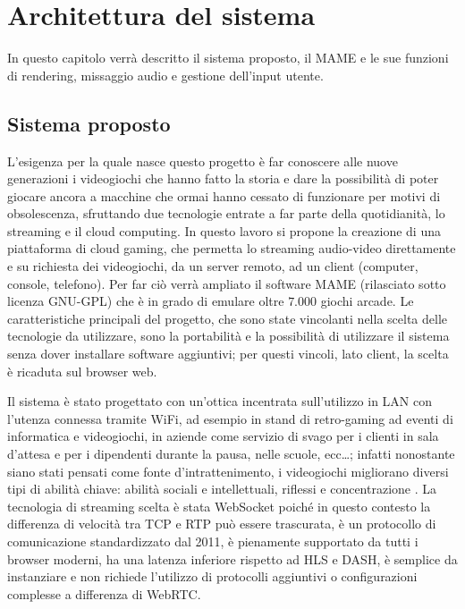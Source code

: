 %
%

\chapter{Architettura del sistema}
In questo capitolo verrà descritto il sistema proposto, il MAME e le sue funzioni di rendering, missaggio audio e gestione dell'input utente.




\section{Sistema proposto} \label{sec:cap2_SistemaProposto}
L'esigenza per la quale nasce questo progetto è far conoscere alle nuove generazioni i videogiochi che hanno fatto la storia e dare la possibilità di poter giocare ancora a macchine che ormai hanno cessato di funzionare per motivi di obsolescenza, sfruttando due tecnologie entrate a far parte della quotidianità, lo streaming e il cloud computing. In questo lavoro si propone la creazione di una piattaforma di cloud gaming, che permetta lo streaming audio-video direttamente e su richiesta dei videogiochi, da un server remoto, ad un client (computer, console, telefono). Per far ciò verrà ampliato il software MAME (rilasciato sotto licenza GNU-GPL) che è in grado di emulare oltre $7.000$ giochi arcade. Le caratteristiche principali del progetto, che sono state vincolanti nella scelta delle tecnologie da utilizzare, sono la portabilità e la possibilità di utilizzare il sistema senza dover installare software aggiuntivi; per questi vincoli, lato client, la scelta è ricaduta sul browser web.

Il sistema è stato progettato con un'ottica incentrata sull'utilizzo in LAN con l'utenza connessa tramite WiFi, ad esempio in stand di retro-gaming ad eventi di informatica e videogiochi, in aziende come servizio di svago per i clienti in sala d'attesa e per i dipendenti durante la pausa, nelle scuole, ecc\dots; infatti nonostante siano stati pensati come fonte d'intrattenimento, i videogiochi migliorano diversi tipi di abilità chiave: abilità sociali e intellettuali, riflessi e concentrazione \parencite{Use_of_Cloud_Gaming_in_Education}. La tecnologia di streaming scelta è stata WebSocket poiché in questo contesto la differenza di velocità tra TCP e RTP può essere trascurata, è un protocollo di comunicazione standardizzato dal 2011, è pienamente supportato da tutti i browser moderni, ha una latenza inferiore rispetto ad HLS e DASH, è semplice da instanziare e non richiede l'utilizzo di protocolli aggiuntivi o configurazioni complesse a differenza di WebRTC.

